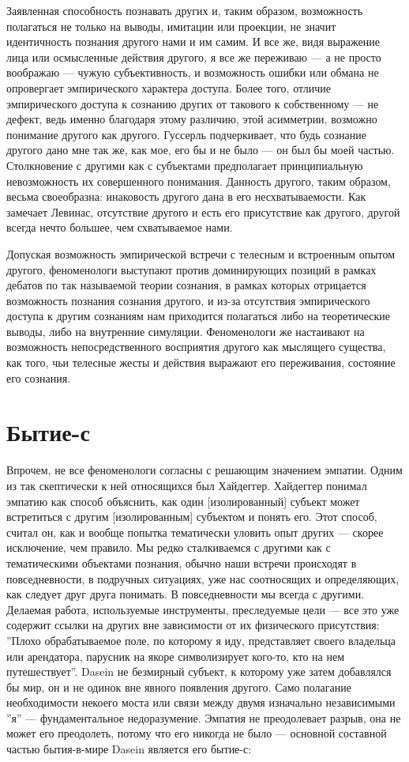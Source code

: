 \documentclass[11pt]{book}
\begin{document}
Заявленная способность познавать других и, таким образом, возможность полагаться не только на выводы, имитации или проекции, не значит идентичность познания другого нами и им самим. И все же, видя выражение лица или осмысленные действия другого, я все же переживаю --- а не просто воображаю --- чужую субъективность, и возможность ошибки или обмана не опровергает эмпирического характера доступа. Более того, отличие эмпирического доступа к сознанию других от такового к собственному --- не дефект, ведь именно благодаря этому различию, этой асимметрии, возможно понимание другого как другого. Гуссерль подчеркивает, что будь сознание другого дано мне так же, как мое, его бы и не было --- он был бы моей частью. Столкновение с другими как с субъектами предполагает принципиальную невозможность их совершенного понимания. Данность другого, таким образом, весьма своеобразна: инаковость другого дана в его несхватываемости. Как замечает Левинас, отсутствие другого и есть его присутствие как другого, другой всегда нечто большее, чем схватываемое нами.

Допуская возможность эмпирической встречи с телесным и встроенным опытом другого, феноменологи выступают против доминирующих позиций в рамках дебатов по так называемой теории сознания, в рамках которых отрицается возможность познания сознания другого, и из-за отсутствия эмпирического доступа к другим сознаниям нам приходится полагаться либо на теоретические выводы, либо на внутренние симуляции. Феноменологи же настаивают на возможность непосредственного восприятия другого как мыслящего существа, как того, чьи телесные жесты и действия выражают его переживания, состояние его сознания.

\section{Бытие-с}

Впрочем, не все феноменологи согласны с решающим значением эмпатии. Одним из так скептически к ней относящихся был Хайдеггер. Хайдеггер понимал эмпатию как способ объяснить, как один [изолированный] субъект может встретиться с другим [изолированным] субъектом и понять его. Этот способ, считал он, как и вообще попытка тематически уловить опыт других --- скорее исключение, чем правило. Мы редко сталкиваемся с другими как с тематическими объектами познания, обычно наши встречи происходят в повседневности, в подручных ситуациях, уже нас соотносящих и определяющих, как следует друг друга понимать. В повседневности мы всегда с другими. Делаемая работа, используемые инструменты, преследуемые цели --- все это уже содержит ссылки на других вне зависимости от их физического присутствия: ''Плохо обрабатываемое поле, по которому я иду, представляет своего владельца или арендатора, парусник на якоре символизирует кого-то, кто на нем путешествует''. Dasein не безмирный субъект, к которому уже затем добавлялся бы мир, он и не одинок вне явного появления другого. Само полагание необходимости некоего моста или связи между двумя изначально независимыми ''я'' --- фундаментальное недоразумение. Эмпатия не преодолевает разрыв, она не может его преодолеть, потому что его никогда не было --- основной составной частью бытия-в-мире Dasein является его бытие-с:
\end{document}
